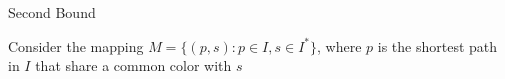 \begin{frame}{Second Bound}

{Consider the mapping
$M = \{(p, s) : p \in I, s \in I^*\}$,
where $p$ is the shortest path in $I$ that share a common color with $s$}



\end{frame}